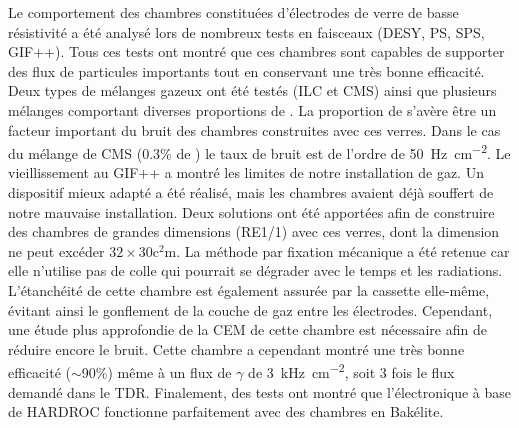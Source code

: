 Le comportement des chambres constituées d'électrodes de verre de basse résistivité a été analysé lors de nombreux tests en faisceaux (DESY, PS, SPS, GIF++). Tous ces tests ont montré que ces chambres sont capables de supporter des flux de particules importants tout en conservant une très bonne efficacité. Deux types de mélanges gazeux ont été testés (ILC et CMS) ainsi que plusieurs mélanges comportant diverses proportions de . La proportion de  s'avère être un facteur important du bruit des chambres construites avec ces verres. Dans le cas du mélange de CMS (\num{0.3}\% de ) le taux de bruit est de l'ordre de \SI{50}{\hertz\per\square\centi\meter}. Le vieillissement au GIF++ a montré les limites de notre installation de gaz. Un dispositif mieux adapté a été réalisé, mais les chambres avaient déjà souffert de notre mauvaise installation. Deux solutions ont été apportées afin de construire des chambres de grandes dimensions (RE1/1) avec ces verres, dont la dimension ne peut excéder $\num{32}\times\num{30} \si{\square\centi\meter}$. La méthode par fixation mécanique a été retenue car elle n'utilise pas de colle qui pourrait se dégrader avec le temps et les radiations. L'étanchéité de cette chambre est également assurée par la cassette elle-même, évitant ainsi le gonflement de la couche de gaz entre les électrodes. Cependant, une étude plus approfondie de la CEM de cette chambre est nécessaire afin de réduire encore le bruit. Cette chambre a cependant montré une très bonne efficacité ($\sim$\num{90}\%) même à un flux de $\gamma$ de \SI{3}{\kilo\hertz\per\square\centi\meter}, soit \num{3} fois le flux demandé dans le TDR. Finalement, des tests ont montré que l'électronique à base de HARDROC fonctionne parfaitement avec des chambres en Bakélite.